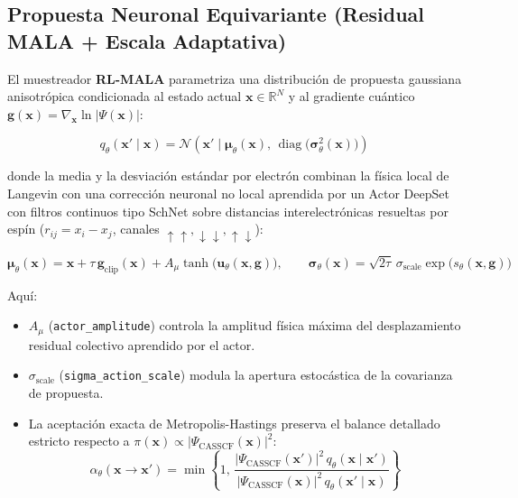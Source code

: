 \documentclass[10pt,a4paper]{article}
\begin{document}
\subsection{Propuesta Neuronal Equivariante (Residual MALA + Escala Adaptativa)}

El muestreador \textbf{RL-MALA} parametriza una distribución de propuesta gaussiana anisotrópica condicionada al estado actual $\mathbf{x} \in \mathbb{R}^N$ y al gradiente cuántico $\mathbf{g}(\mathbf{x}) = \nabla_{\mathbf{x}} \ln |\Psi(\mathbf{x})|$:



\[
q_\theta(\mathbf{x}' \mid \mathbf{x}) = \mathcal{N}\!\left(\mathbf{x}' \;\Big|\; \boldsymbol{\mu}_\theta(\mathbf{x}),\, \operatorname{diag}\!\big(\boldsymbol{\sigma}_\theta^2(\mathbf{x})\big)\right)
\]



donde la media y la desviación estándar por electrón combinan la física local de Langevin con una corrección neuronal no local aprendida por un Actor DeepSet con filtros continuos tipo SchNet sobre distancias interelectrónicas resueltas por espín ($r_{ij} = x_i - x_j$, canales $\uparrow\uparrow, \downarrow\downarrow, \uparrow\downarrow$):



\[
\boldsymbol{\mu}_\theta(\mathbf{x}) = \mathbf{x} + \tau\,\mathbf{g}_{\mathrm{clip}}(\mathbf{x}) + A_\mu \tanh\!\big(\mathbf{u}_\theta(\mathbf{x}, \mathbf{g})\big), \qquad
\boldsymbol{\sigma}_\theta(\mathbf{x}) = \sqrt{2\tau}\,\sigma_{\mathrm{scale}} \exp\!\big(s_\theta(\mathbf{x}, \mathbf{g})\big)
\]



Aquí:

\begin{itemize}
\item $A_\mu$ (\texttt{actor\_amplitude}) controla la amplitud física máxima del desplazamiento residual colectivo aprendido por el actor.
\item $\sigma_{\mathrm{scale}}$ (\texttt{sigma\_action\_scale}) modula la apertura estocástica de la covarianza de propuesta.
\item La aceptación exacta de Metropolis-Hastings preserva el balance detallado estricto respecto a $\pi(\mathbf{x}) \propto |\Psi_{\mathrm{CASSCF}}(\mathbf{x})|^2$:
\[
  \alpha_\theta(\mathbf{x} \to \mathbf{x}') = \min\!\left\{1,\, \frac{|\Psi_{\mathrm{CASSCF}}(\mathbf{x}')|^2 \, q_\theta(\mathbf{x} \mid \mathbf{x}')}{|\Psi_{\mathrm{CASSCF}}(\mathbf{x})|^2 \, q_\theta(\mathbf{x}' \mid \mathbf{x})}\right\}
\]

\end{itemize}
\end{document}

